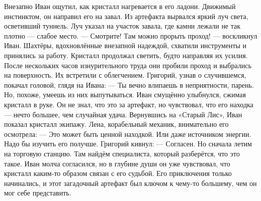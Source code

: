 \documentclass[12pt,a4paper]{book}
\begin{document}
Внезапно Иван ощутил, как кристалл нагревается в его ладони. Движимый инстинктом, он направил его на завал. Из артефакта вырвался яркий луч света, осветивший туннель. Луч указал на участок завала, где камни лежали не так плотно — слабое место.
— Смотрите! Там можно прорыть проход! — воскликнул Иван.
Шахтёры, вдохновлённые внезапной надеждой, схватили инструменты и принялись за работу. Кристалл продолжал светить, будто направляя их усилия. После нескольких часов изнурительного труда они пробили проход и выбрались на поверхность.
Их встретили с облегчением. Григорий, узнав о случившемся, покачал головой, глядя на Ивана:
— Ты вечно влипаешь в неприятности, парень. Но, похоже, умеешь из них выпутываться.
Иван смущённо улыбнулся, сжимая кристалл в руке. Он не знал, что это за артефакт, но чувствовал, что его находка — нечто большее, чем случайная удача.
Вернувшись на «Старый Лис», Иван показал кристалл экипажу. Лена, корабельный механик, внимательно его осмотрела:
— Это может быть ценной находкой. Или даже источником энергии. Надо бы изучить его получше.
Григорий кивнул:
— Согласен. Но сначала летим на торговую станцию. Там найдём специалиста, который разберётся, что это такое.
Иван молча согласился, но в глубине души он уже чувствовал, что кристалл каким-то образом связан с его судьбой. Его приключения только начинались, и этот загадочный артефакт был ключом к чему-то большему, чем он мог себе представить.
\end{document}
